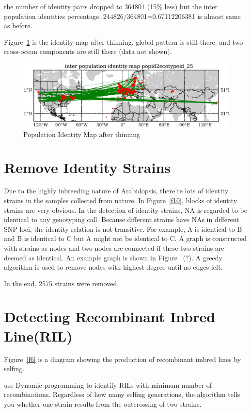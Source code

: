 \documentclass[a4paper,10pt]{article}
\begin{document}
the number of identity pairs dropped to 364801 (15\% less) but the inter population identities percentage, 244826/364801=0.67112206381 is almost same as before.

Figure~\ref{f28} is the identity map after thinning. global pattern is still there. and two cross-ocean components are still there (data not shown).

\begin{figure}
\includegraphics[width=1\textwidth]{figures/identity_map2_complete_site_network.eps}
\caption{Population Identity Map after thinning}\label{f28}
\end{figure}

\section{Remove Identity Strains}
Due to the highly inbreeding nature of Arabidopsis, there're lots of identity strains in the samples collected from nature. In Figure~\ref{f10}, blocks of identity strains are very obvious. In the detection of identity strains, NA is regarded to be identical to any genotyping call. Because different strains have NAs in different SNP loci, the identity relation is not transitive. For example, A is identical to B and B is identical to C but A might not be identical to C. A graph is constructed with strains as nodes and two nodes are connected if these two strains are deemed as identical. An example graph is shown in Figure ~(?). A greedy algorithm is used to remove nodes with highest degree until no edges left.

In the end, 2575 strains were removed.

\section{Detecting Recombinant Inbred Line(RIL)}
Figure~\ref{f6} is a diagram showing the production of recombinant imbred lines by selfing.

use Dynamic programming to identify RILs with minimum number of recombinations. Regardless of how many selfing generations, the algorithm tells you whether one strain results from the outcrossing of two strains.
\end{document}
